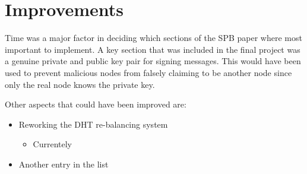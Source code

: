 \chapter{Improvements}\label{ch:improvements}

Time was a major factor in deciding which sections of the SPB paper where most important to implement. A key section that was included in the final project was a genuine private and public key pair for signing messages. This would have been used to prevent malicious nodes from falsely claiming to be another node since only the real node knows the private key.

Other aspects that could have been improved are:

\begin{itemize}
  \item Reworking the DHT re-balancing system
  \begin{itemize}
      \item Currentely
  \end{itemize}
  \item Another entry in the list
\end{itemize}
